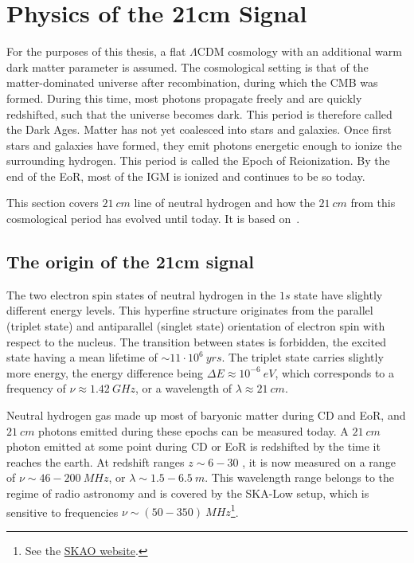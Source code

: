 \section{Physics of the 21cm Signal}
For the purposes of this thesis, a flat $\Lambda$CDM cosmology with an additional warm dark matter parameter is assumed. The cosmological setting is that of the matter-dominated universe after recombination, during which the CMB was formed. During this time, most photons propagate freely and are quickly redshifted, such that the universe becomes dark. This period is therefore called the Dark Ages. Matter has not yet coalesced into stars and galaxies. Once first stars and galaxies have formed, they emit photons energetic enough to ionize the surrounding hydrogen. This period is called the Epoch of Reionization. By the end of the EoR, most of the IGM is ionized and continues to be so today.

This section covers $21~\si{cm}$ line of neutral hydrogen and how the $21~{cm}$ from this cosmological period has evolved until today. It is based on~\cite{fundamentals}.

\subsection{The origin of the 21cm signal}
The two electron spin states of neutral hydrogen in the $1s$ state have slightly different energy levels. This hyperfine structure originates from the parallel (triplet state) and antiparallel (singlet state) orientation of electron spin with respect to the nucleus. The transition between states is forbidden, the excited state having a mean lifetime of $\sim 11\cdot 10^6~\si{yrs}$. The triplet state carries slightly more energy, the energy difference being $\Delta E \approx 10^{-6}~\si{eV}$, which corresponds to a frequency of $\nu \approx 1.42~\si{GHz}$, or a wavelength of $\lambda \approx 21~\si{cm}$. 

Neutral hydrogen gas made up most of baryonic matter during CD and EoR, and $21~\si{cm}$ photons emitted during these epochs can be measured today. A $21~\si{cm}$ photon emitted at some point during CD or EoR is redshifted by the time it reaches the earth. At redshift ranges $z \sim 6-30$ , it is now measured on a range of $\nu\sim 46-200~\si{MHz}$, or $\lambda\sim 1.5-6.5~\si{m}$. This wavelength range belongs to the regime of radio astronomy and is covered by the SKA-Low setup, which is sensitive to frequencies $\nu \sim (50-350)~\si{MHz}$\footnote{See the \href{https://www.skao.int/en/science-users/118/ska-telescope-specifications}{SKAO website}.}.

